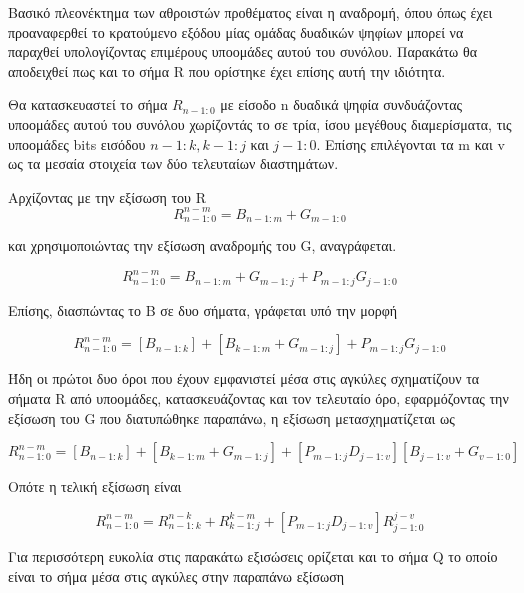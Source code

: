 Βασικό πλεονέκτημα των αθροιστών προθέματος είναι η αναδρομή, όπου όπως 
έχει προαναφερθεί το κρατούμενο εξόδου μίας ομάδας δυαδικών ψηφίων μπορεί
να παραχθεί υπολογίζοντας επιμέρους υποομάδες αυτού του συνόλου.
Παρακάτω θα αποδειχθεί πως και το σήμα R που ορίστηκε έχει 
επίσης αυτή την ιδιότητα.

Θα κατασκευαστεί το σήμα $R_{n-1:0}$ με είσοδο n δυαδικά ψηφία συνδυάζοντας
υποομάδες αυτού του συνόλου χωρίζοντάς το σε τρία, ίσου μεγέθους διαμερίσματα, τις υποομάδες bits εισόδου $n-1:k , k-1:j$ και $j-1:0$. Επίσης επιλέγονται τα m και v ως τα μεσαία στοιχεία των δύο τελευταίων διαστημάτων.
 

Αρχίζοντας με την εξίσωση του R %
\begin{equation*}
    R^{n-m}_{n-1:0} = B_{n-1:m} + G_{m-1:0}
\end{equation*}

και χρησιμοποιώντας την εξίσωση αναδρομής του G, αναγράφεται.

\begin{equation*}
    R^{n-m}_{n-1:0} = B_{n-1:m} + G_{m-1:j} + P_{m-1:j}G_{j-1:0}
\end{equation*}

Επίσης, διασπώντας το B σε δυο σήματα, γράφεται υπό την μορφή

\begin{equation*}
    R^{n-m}_{n-1:0} = [ B_{n-1:k} ] + [ B_{k-1:m} + G_{m-1:j} ] + P_{m-1:j}G_{j-1:0}
\end{equation*}

Ήδη οι πρώτοι δυο όροι που έχουν εμφανιστεί μέσα στις αγκύλες σχηματίζουν τα 
σήματα R από υποομάδες, κατασκευάζοντας και τον τελευταίο όρο, εφαρμόζοντας την
εξίσωση του G που διατυπώθηκε παραπάνω, η εξίσωση μετασχηματίζεται ως

\begin{equation*}
    R^{n-m}_{n-1:0} = [ B_{n-1:k} ] + [ B_{k-1:m} + G_{m-1:j} ] + [ P_{m-1:j}D_{j-1:v} ][B_{j-1:v}+G_{v-1:0}]
\end{equation*}

Οπότε η τελική εξίσωση είναι 

\begin{equation}
    R^{n-m}_{n-1:0} = R^{n-k}_{n-1:k} + R^{k-m}_{k-1:j} + [ P_{m-1:j}D_{j-1:v} ]R^{j-v}_{j-1:0}
\end{equation}

Για περισσότερη ευκολία στις παρακάτω εξισώσεις ορίζεται και το σήμα Q 
το οποίο είναι το σήμα μέσα στις αγκύλες στην παραπάνω εξίσωση  


